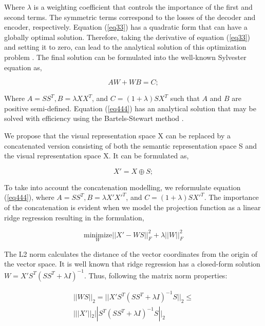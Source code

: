 \documentclass{article}
\begin{document}
Where $\lambda$ is a weighting coefficient that controls the importance of the first and second terms. The symmetric terms correspond to the losses of the decoder and encoder, respectively. Equation (\ref{eq33}) has a quadratic form that can have a globally optimal solution. Therefore, taking the derivative of equation (\ref{eq33}) and setting it to zero, can lead to the analytical solution of this optimization problem \cite{b10}. The final solution can be formulated into the well-known Sylvester equation as, 

\begin{equation}
\label{eq444}
AW+WB = C;
\end{equation}

Where $A = SS^T, B = \lambda XX^T$, and $C = (1 + \lambda) SX^T$ such that $A$ and $B$ are positive semi-defined. Equation (\ref{eq444}) has an analytical solution that may be solved with efficiency using the Bartels-Stewart method \cite{b50}.
\par We propose that the visual representation space X can be replaced by a concatenated version consisting of both the semantic representation space S and the visual representation space X. It can be formulated as, 

\begin{equation}
\label{eq555}
X'= X \oplus S;
\end{equation}

To take into account the concatenation modelling, we reformulate equation (\ref{eq444}), where $A = SS^T, B = \lambda X'X'^T$, and $C = (1 + \lambda) SX'^T$. 
The importance of the concatenation is evident when we model the projection function as a linear ridge regression resulting in the formulation, 

\begin{equation}
\label{eq666}
\underset{W}{\text{minimize}}  ||X'-WS||^{2}_{F} + \lambda||W||^{2}_{F}
\end{equation}

The L2 norm calculates the distance of the vector coordinates from the origin of the vector space. It is well known that ridge regression has a closed-form solution $W = X'S^T(SS^T+\lambda I)^{-1}$. Thus, following the matrix norm properties: 

\begin{equation}
\label{eq777}
\begin{split}
||WS||_2 = ||X'S^T(SS^T+\lambda I)^{-1}S||_2 \leq\\ |||X'||_2||S^T(SS^T+\lambda I)^{-1}S||_2
\end{split}
\end{equation}
\end{document}

